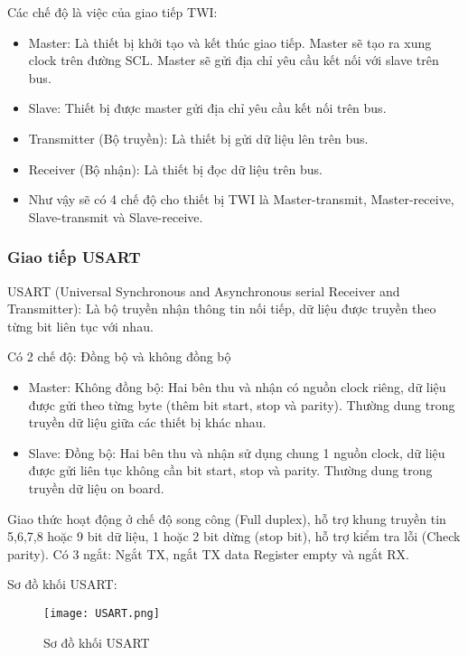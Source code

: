 Các chế độ là việc của giao tiếp TWI:
\begin{itemize}
	
	\item Master: Là thiết bị khởi tạo và kết thúc giao tiếp. Master sẽ tạo ra xung clock trên đường SCL. Master sẽ gửi địa chỉ yêu cầu kết nối với slave trên bus.
	\item Slave: Thiết bị được master gửi địa chỉ yêu cầu kết nối trên bus.
	\item Transmitter (Bộ truyền): Là thiết bị gửi dữ liệu lên trên bus.
	\item Receiver (Bộ nhận): Là thiết bị đọc dữ liệu trên bus.
	\item Như vậy sẽ có 4 chế độ cho thiết bị TWI là Master-transmit, Master-receive, Slave-transmit và Slave-receive.

\end{itemize}



\subsubsection{Giao tiếp USART}
USART (Universal Synchronous and Asynchronous serial Receiver and Transmitter): Là bộ truyền nhận thông tin nối tiếp, dữ liệu được truyền theo từng bit liên tục với nhau.

Có 2 chế độ: Đồng bộ và không đồng bộ

\begin{itemize}
	
	\item Master: Không đồng bộ: Hai bên thu và nhận có nguồn clock riêng, dữ liệu được gửi theo từng byte (thêm bit start, stop và parity). Thường dung trong truyền dữ liệu giữa các thiết bị khác nhau.
	\item Slave: Đồng bộ: Hai bên thu và nhận sử dụng chung 1 nguồn clock, dữ liệu được gửi liên tục không cần bit start, stop và parity. Thường dung trong truyền dữ liệu on board.
	
\end{itemize}

Giao thức hoạt động ở chế độ song công (Full duplex), hỗ trợ khung truyền tin 5,6,7,8 hoặc 9 bit dữ liệu, 1 hoặc 2 bit dừng (stop bit), hỗ trợ kiểm tra lỗi (Check parity). Có 3 ngắt: Ngắt TX, ngắt TX data Register empty và ngắt RX.

Sơ đồ khối USART:

\begin{figure}[h!]
	\centering
	\texttt{[image: USART.png]}
	\caption[Sơ đồ khối USART]{Sơ đồ khối USART}
	\label{fig:Sơ đồ khối USART}
\end{figure}

